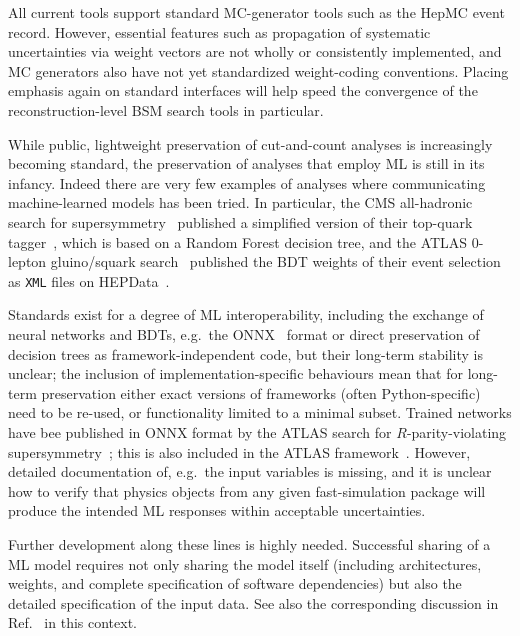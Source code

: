 \documentclass[11pt]{article}
\begin{document}
All current tools support standard MC-generator tools such as the HepMC event record. However, essential features such as propagation of systematic uncertainties via weight vectors are not wholly or consistently implemented, and MC generators also have not yet standardized weight-coding conventions. Placing emphasis again on standard interfaces will help speed the convergence of the reconstruction-level \gls{BSM} search tools in particular.

While public, lightweight preservation of cut-and-count analyses is increasingly becoming standard, the preservation of analyses that employ \gls{ML} is still in its infancy. 
Indeed there are very few examples of analyses where communicating machine-learned models has been tried. In particular, the \gls{CMS} all-hadronic search for supersymmetry~\cite{CMS:2017qxu} published a simplified version of their top-quark tagger~\cite{cms:toptagger}, which is based on a Random Forest decision tree, and the \gls{ATLAS} 0-lepton gluino/squark search~\cite{ATLAS:2020syg,Uno:2763449} published the \gls{BDT} weights of their event selection as \texttt{XML} files on HEPData~\cite{hepdata.95664.v2/r8}.  

Standards exist for a degree of \gls{ML} interoperability, including the exchange of neural networks and \glspl{BDT}, e.g.~the 
\gls{ONNX}~\cite{onnx} format or direct preservation of decision trees as framework-independent code, but their long-term stability is unclear; the inclusion of implementation-specific behaviours mean that for long-term preservation either exact versions of frameworks (often Python-specific) need to be re-used, or functionality limited to a minimal subset. Trained networks have bee published in \gls{ONNX} format by the \gls{ATLAS} search for $R$-parity-violating supersymmetry~\cite{ATLAS:2021fbt,hepdata.104860.v1/r3}; this is also included in the \gls{ATLAS} \simpleanalysis framework~\cite{atlas:simpleanalysis}. 
However, detailed documentation of, e.g.~the input variables is missing, and it is unclear how to verify that physics objects from any given fast-simulation package will produce the intended \gls{ML} responses within acceptable uncertainties.

Further development along these lines is highly needed. Successful sharing of a \gls{ML} model requires not only sharing the model itself (including architectures, weights, and complete specification of software dependencies) but also the detailed specification of the input data. See also the corresponding discussion in Ref.~\cite{snowmass:MLevts} in this context.
\end{document}

